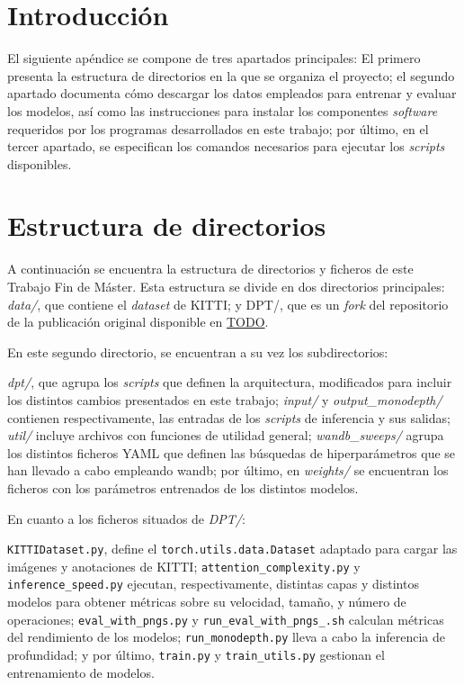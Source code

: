 
\section{Introducción}
El siguiente apéndice se compone de tres apartados principales: El primero presenta la estructura de directorios en la que se organiza el proyecto; el segundo apartado documenta cómo descargar los datos empleados para entrenar y evaluar los modelos, así como las instrucciones para instalar los componentes \textit{software} requeridos por los programas desarrollados en este trabajo; por último, en el tercer apartado, se especifican los comandos necesarios para ejecutar los \textit{scripts} disponibles.

\section{Estructura de directorios}

A continuación se encuentra la estructura de directorios y ficheros de este Trabajo Fin de Máster. Esta estructura se divide en dos directorios principales: \textit{data/}, que contiene el \textit{dataset} de KITTI; y DPT/, que es un \textit{fork} del repositorio de la publicación original \cite{visiontransformersDPT} disponible en \url{TODO}.

En este segundo directorio, se encuentran a su vez los subdirectorios: 

\textit{dpt/}, que agrupa los \textit{scripts} que definen la arquitectura, modificados para incluir los distintos cambios presentados en este trabajo; \textit{input/} y \textit{output{\_}monodepth/} contienen respectivamente, las entradas de los \textit{scripts} de inferencia y sus salidas; \textit{util/} incluye archivos con funciones de utilidad general; \textit{wandb{\_}sweeps/} agrupa los distintos ficheros YAML que definen las búsquedas de hiperparámetros que se han llevado a cabo empleando wandb; por último, en \textit{weights/} se encuentran los ficheros con los parámetros entrenados de los distintos modelos.

En cuanto a los ficheros situados de \textit{DPT/}: 

\texttt{KITTIDataset.py}, define el \texttt{torch.utils.data.Dataset} adaptado para cargar las imágenes y anotaciones de KITTI; \texttt{attention{\_}complexity.py} y \texttt{inference{\_}speed.py} ejecutan, respectivamente, distintas capas y distintos modelos para obtener métricas sobre su velocidad, tamaño, y número de operaciones; \texttt{eval{\_}with{\_}pngs.py} y \texttt{run{\_}eval{\_}with{\_}pngs{\_}.sh} calculan métricas del rendimiento de los modelos; \texttt{run{\_}monodepth.py} lleva a cabo la inferencia de profundidad; y por último, \texttt{train.py} y \texttt{train{\_}utils.py} gestionan el entrenamiento de modelos.

